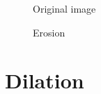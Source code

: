 \begin{figure}[!htb]\centering
    \begin{minipage}{0.45\textwidth}
        \caption{\small{Original image}}
    \end{minipage}
    \begin{minipage}{0.45\textwidth}
        \caption{\small{Erosion}}\label{diagram:erosion}
    \end{minipage}
\end{figure}


\section{Dilation}

